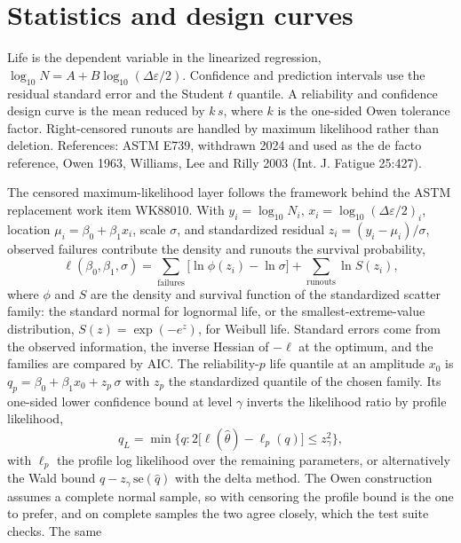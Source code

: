 \documentclass[11pt]{article}
\begin{document}
\section{Statistics and design curves}
Life is the dependent variable in the linearized regression,
\(\log_{10} N = A + B \log_{10}(\Delta\varepsilon/2)\). Confidence and prediction
intervals use the residual standard error and the Student \(t\) quantile. A
reliability and confidence design curve is the mean reduced by \(k\,s\), where
\(k\) is the one-sided Owen tolerance factor. Right-censored runouts are handled
by maximum likelihood rather than deletion. References: ASTM E739, withdrawn 2024
and used as the de facto reference, Owen 1963, Williams, Lee and Rilly 2003 (Int.
J. Fatigue 25:427).

The censored maximum-likelihood layer follows the framework behind the ASTM
replacement work item WK88010. With \(y_i = \log_{10} N_i\),
\(x_i = \log_{10}(\Delta\varepsilon/2)_i\), location
\(\mu_i = \beta_0 + \beta_1 x_i\), scale \(\sigma\), and standardized residual
\(z_i = (y_i-\mu_i)/\sigma\), observed failures contribute the density and
runouts the survival probability,
\begin{equation}
\ell(\beta_0,\beta_1,\sigma)
= \sum_{\text{failures}} \Big[\ln\phi(z_i) - \ln\sigma\Big]
+ \sum_{\text{runouts}} \ln S(z_i),
\end{equation}
where \(\phi\) and \(S\) are the density and survival function of the
standardized scatter family: the standard normal for lognormal life, or the
smallest-extreme-value distribution, \(S(z)=\exp(-e^{z})\), for Weibull
life. Standard errors come from the observed information, the inverse
Hessian of \(-\ell\) at the optimum, and the families are compared by AIC.
The reliability-\(p\) life quantile at an amplitude \(x_0\) is
\(q_p = \beta_0 + \beta_1 x_0 + z_p\,\sigma\) with \(z_p\) the standardized
quantile of the chosen family. Its one-sided lower confidence bound at level
\(\gamma\) inverts the likelihood ratio by profile likelihood,
\begin{equation}
q_L = \min\Big\{q : 2\big[\ell(\hat\theta) - \ell_p(q)\big]
\le z_\gamma^2\Big\},
\end{equation}
with \(\ell_p\) the profile log likelihood over the remaining parameters, or
alternatively the Wald bound \(\hat q - z_\gamma\,\mathrm{se}(\hat q)\) with
the delta method. The Owen construction assumes a complete normal sample, so
with censoring the profile bound is the one to prefer, and on complete
samples the two agree closely, which the test suite checks. The same
\end{document}
